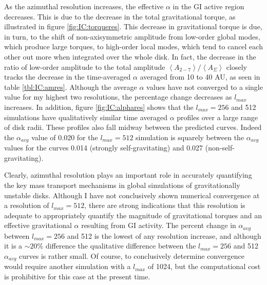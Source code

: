 As the azimuthal resolution increases, the effective $\alpha$ in the GI active region decreases. This is due to the decrease in the total gravitational torque, as illustrated in figure \ref{fig:IC:torqueres}. This decrease in gravitational torque is due, in turn, to the shift of non-axisymmetric amplitude from low-order global modes, which produce large torques, to high-order local modes, which tend to cancel each other out more when integrated over the whole disk. In fact, the decrease in the ratio of low-order amplitude to the total amplitude $\left<A_{2-7}\right>/\left<A_\Sigma\right>$ closely tracks the decrease in the time-averaged $\alpha$ averaged from 10 to 40 AU, as seen in table \ref{tbl:IC:amres}. Although the average $\alpha$ values have not converged to a single value for my highest two resolutions, the percentage change decreases as $l_{max}$ increases. In addition, figure \ref{fig:IC:alphares} shows that the $l_{max} = 256$ and 512 simulations have qualitatively similar time averaged $\alpha$ profiles over a large range of disk radii. These profiles also fall midway between the predicted \citeauthor{gammie2001} curves. Indeed the $\alpha_{avg}$ value of 0.020 for the $l_{max} = 512$ simulation is squarely between the $\alpha_{avg}$ values for the \citeauthor{gammie2001} curves 0.014 (strongly self-gravitating) and 0.027 (non-self-gravitating). 

Clearly, azimuthal resolution plays an important role in accurately quantifying the key mass transport mechanisms in global simulations of gravitationally unstable disks. Although I have not conclusively shown numerical convergence at a resolution of $l_{max} = 512$, there are strong indications that this resolution is adequate to appropriately quantify the magnitude of gravitational torques and an effective gravitational $\alpha$ resulting from GI activity. The percent change in $\alpha_{avg}$ between $l_{max} = 256$ and 512 is the lowest of any resolution increase, and although it is a $\sim 20\%$ difference the qualitative difference between the $l_{max} = 256$ and 512 $\alpha_{avg}$ curves is rather small. Of course, to conclusively determine convergence would require another simulation with a $l_{max}$ of 1024, but the computational cost is prohibitive for this case at the present time.

